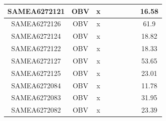 \documentclass[../main.tex]{subfiles}
\begin{document}
\begin{flushleft}
\begin{footnotesize}
\begin{longtable}{|c|c|c|c|c|c|c|}
    \hline
    SAMEA6272121  & OBV   & x                                                            & ~          & ~                                                                           & ~                                                                 & 16.58     \\ 
    \hline
    SAMEA6272126  & OBV   & x                                                            & ~          & ~                                                                           & ~                                                                 & 61.9      \\ 
    \hline
    SAMEA6272124  & OBV   & x                                                            & ~          & ~                                                                           & ~                                                                 & 18.82     \\ 
    \hline
    SAMEA6272122  & OBV   & x                                                            & ~          & ~                                                                           & ~                                                                 & 18.33     \\ 
    \hline
    SAMEA6272127  & OBV   & x                                                            & ~          & ~                                                                           & ~                                                                 & 53.65     \\ 
    \hline
    SAMEA6272125  & OBV   & x                                                            & ~          & ~                                                                           & ~                                                                 & 23.01     \\ 
    \hline
    SAMEA6272084  & OBV   & x                                                            & ~          & ~                                                                           & ~                                                                 & 11.78     \\ 
    \hline
    SAMEA6272083  & OBV   & x                                                            & ~          & ~                                                                           & ~                                                                 & 31.95     \\ 
    \hline
    SAMEA6272082  & OBV   & x                                                            & ~          & ~                                                                           & ~                                                                 & 23.39     \\ 

\end{longtable}
\end{footnotesize}
\end{flushleft}
\end{document}
